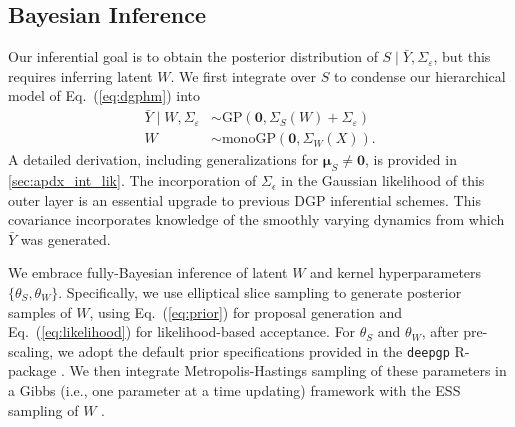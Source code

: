 \documentclass[11pt]{article}
\begin{document}
\subsection{Bayesian Inference}\label{sec:inference}

Our inferential goal is to obtain the posterior distribution of 
$S\mid\bar{Y},\Sigma_\varepsilon$, but this requires inferring latent $W$.  
We first integrate over $S$ to condense our hierarchical model of Eq.~(\ref{eq:dgphm}) into
\begin{align}
\label{eq:likelihood}
\bar{Y} \mid W, \Sigma_\varepsilon &\sim \textrm{GP}(\mathbf{0}, \Sigma_S(W) + \Sigma_\varepsilon) \\
\label{eq:prior}
W &\sim \mathrm{monoGP}\left(\mathbf{0}, \Sigma_W(X)\right).
\end{align}
A detailed derivation, including generalizations for 
$\boldsymbol{\mu}_S\neq\mathbf{0}$, is provided in \ref{sec:apdx_int_lik}. 
The incorporation of $\Sigma_\epsilon$ in the
Gaussian likelihood of this outer layer is an essential upgrade to previous DGP inferential schemes.
This covariance incorporates knowledge of the smoothly varying dynamics from which $\bar{Y}$ was
generated.

We embrace fully-Bayesian inference of latent $W$ and kernel hyperparameters $\{\theta_S, \theta_W\}$.
Specifically, we use elliptical slice sampling \citep[ESS;][]{murray2010elliptical} to 
generate posterior samples of $W$, using Eq.~(\ref{eq:prior}) for proposal generation and 
Eq.~(\ref{eq:likelihood}) for likelihood-based acceptance.  
For $\theta_S$ and $\theta_W$, after pre-scaling, we adopt the default prior specifications 
provided in the {\tt deepgp} {\sf R}-package \citep{deepgp}.
We then integrate Metropolis-Hastings sampling of these parameters in a Gibbs (i.e., one parameter 
at a time updating) framework with the ESS sampling of $W$ \citep{sauer2023active}.
\end{document}
